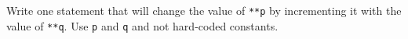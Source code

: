 Write one statement that will change the value of \texttt{**p} by incrementing it with the value of \texttt{**q}. Use \texttt{p} and \texttt{q} and not hard-coded constants.

